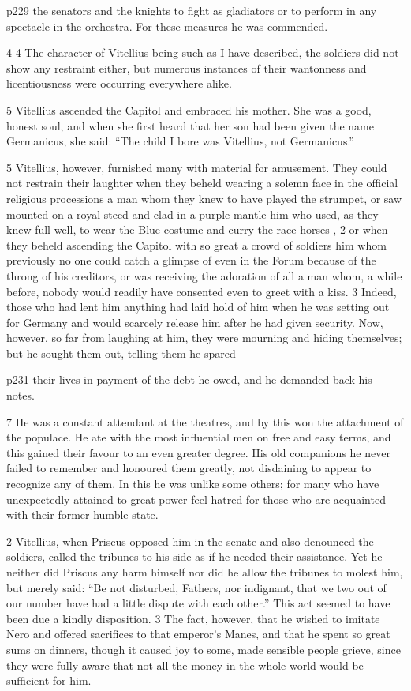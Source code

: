 p229 the senators and the knights to fight as gladiators or to perform in any spectacle in the orchestra. For these measures he was commended.

4
4 The character of Vitellius being such as I have described, the soldiers did not show any restraint either, but numerous instances of their wantonness and licentiousness were occurring everywhere alike.

5
Vitellius ascended the Capitol and embraced his mother. She was a good, honest soul, and when she first heard that her son had been given the name Germanicus, she said: ``The child I bore was Vitellius, not Germanicus.''

5
Vitellius, however, furnished many with material for amusement. They could not restrain their laughter when they beheld wearing a solemn face in the official religious processions a man whom they knew to have played the strumpet, or saw mounted on a royal steed and clad in a purple mantle him who used, as they knew full well, to wear the Blue costume and curry the race-horses , 2 or when they beheld ascending the Capitol with so great a crowd of soldiers him whom previously no one could catch a glimpse of even in the Forum because of the throng of his creditors, or was receiving the adoration of all a man whom, a while before, nobody would readily have consented even to greet with a kiss. 3 Indeed, those who had lent him anything had laid hold of him when he was setting out for Germany and would scarcely release him after he had given security. Now, however, so far from laughing at him, they were mourning and hiding themselves; but he sought them out, telling them he spared

p231 their lives in payment of the debt he owed, and he demanded back his notes.

7
He was a constant attendant at the theatres, and by this won the attachment of the populace. He ate with the most influential men on free and easy terms, and this gained their favour to an even greater degree. His old companions he never failed to remember and honoured them greatly, not disdaining to appear to recognize any of them. In this he was unlike some others; for many who have unexpectedly attained to great power feel hatred for those who are acquainted with their former humble state.

2 Vitellius, when Priscus opposed him in the senate and also denounced the soldiers, called the tribunes to his side as if he needed their assistance. Yet he neither did Priscus any harm himself nor did he allow the tribunes to molest him, but merely said: ``Be not disturbed, Fathers, nor indignant, that we two out of our number have had a little dispute with each other.'' This act seemed to have been due a kindly disposition. 3 The fact, however, that he wished to imitate Nero and offered sacrifices to that emperor's Manes, and that he spent so great sums on dinners, though it caused joy to some, made sensible people grieve, since they were fully aware that not all the money in the whole world would be sufficient for him.

